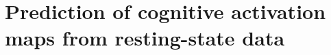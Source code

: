 











\section{Prediction of cognitive activation maps from resting-state data}\label{chapter1_activation_maps}




